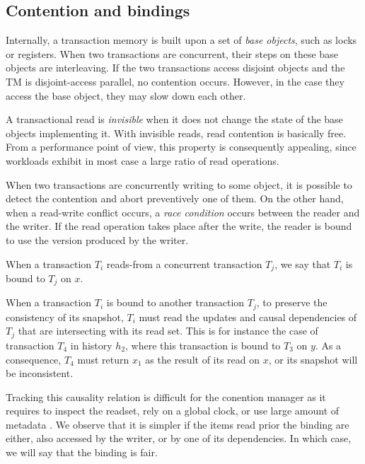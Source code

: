 \subsection{Contention and bindings}

Internally, a transaction memory is built upon a set of \emph{base objects}, such as locks or registers.
When two transactions are concurrent, their steps on these base objects are interleaving.
If the two transactions access disjoint objects and the TM is disjoint-access parallel, no contention occurs.
However, in the case they access the base object, they may slow down each other.

A transactional read is \emph{invisible} when it does not change the state of the base objects implementing it.
With invisible reads, read contention is basically free.
From a performance point of view, this property is consequently appealing, since workloads exhibit in most case a large ratio of read operations.

When two transactions are concurrently writing to some object, it is possible to detect the contention and abort preventively one of them.
On the other hand, when a read-write conflict occurs, a \emph{race condition} occurs between the reader and the writer.
If the read operation takes place after the write, the reader is bound to use the version produced by the writer.

\begin{definition}[Binding]
  When a transaction $T_i$ reads-from a concurrent transaction $T_j$, we say that $T_i$ is bound to $T_j$ on $x$.
\end{definition}

When a transaction $T_i$ is bound to another transaction $T_j$, to preserve the consistency of its snapshot, $T_i$ must read the updates and causal dependencies of $T_j$ that are intersecting with its read set.
This is for instance the case of transaction $T_4$ in history $h_2$, where this transaction is bound to $T_3$ on $y$.
As a consequence, $T_4$ must return $x_1$ as the result of its read on $x$, or its snapshot will be inconsistent.

Tracking this causality relation is difficult for the conention manager as it requires to inspect the readset, rely on a global clock, or use large amount of metadata \cite{}.
We observe that it is simpler if the items read prior the binding are either, also accessed by the writer, or by one of its dependencies.
In which case, we will say that the binding is fair.

